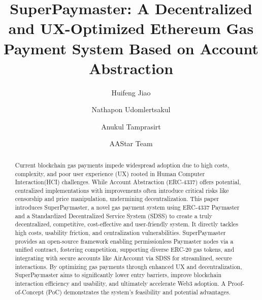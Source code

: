 \documentclass[preprint,12pt]{elsarticle}
\begin{document}
\begin{frontmatter}


\title{SuperPaymaster: A Decentralized and UX-Optimized Ethereum Gas Payment System Based on Account Abstraction}


\author[icdi]{Huifeng Jiao}
\author[icdi]{Nathapon Udomlertsakul}
\author[icdi]{Anukul Tamprasirt}
\author[aastar]{AAStar Team}


\begin{abstract}
Current blockchain gas payments impede widespread adoption due to high costs, complexity, and poor user experience (UX) rooted in Human Computer Interaction(HCI) challenges. While Account Abstraction (ERC-4337) offers potential, centralized implementations with improvements often introduce critical risks like censorship and price manipulation, undermining decentralization. This paper introduces SuperPaymaster, a novel gas payment system using ERC-4337 Paymaster and a Standardized Decentralized Service System (SDSS) to create a truly decentralized, competitive, cost-effective and user-friendly system. It directly tackles high costs, usability friction, and centralization vulnerabilities. SuperPaymaster provides an open-source framework enabling permissionless Paymaster nodes via a unified contract, fostering competition, supporting diverse ERC-20 gas tokens, and integrating with secure accounts like AirAccount via SDSS for streamlined, secure interactions. By optimizing gas payments through enhanced UX and decentralization, SuperPaymaster aims to significantly lower entry barriers, improve blockchain interaction efficiency and usability, and ultimately accelerate Web3 adoption. A Proof-of-Concept (PoC) demonstrates the system's feasibility and potential advantages.
\end{abstract}


\end{frontmatter}
\end{document}
